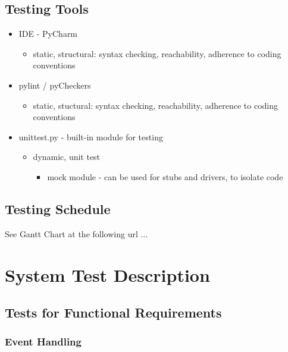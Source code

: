 \documentclass[12pt, titlepage]{article}
\begin{document}
	\subsection{Testing Tools}
	\begin{itemize}
		\itemsep0em
		\item IDE - PyCharm
		\vspace{-3mm}
		\begin{itemize}
			\item static, structural: syntax checking, reachability, adherence 
			to coding conventions
		\end{itemize}
		\item pylint / pyCheckers
		\vspace{-3mm}
		\begin{itemize}
			\item static, stuctural: syntax checking, reachability, adherence 
			to coding conventions
		\end{itemize}
		\item unittest.py - built-in module for testing
		\vspace{-3mm}
		\begin{itemize}
			\item dynamic, unit test
			\vspace{-2mm}
			\begin{itemize}
				\item mock module - can be used for stubs and drivers, to 
				isolate code
			\end{itemize}
		\end{itemize}
	\end{itemize}
		
	\subsection{Testing Schedule}
	
	See Gantt Chart at the following url ...
	\section{System Test Description}
	
	\subsection{Tests for Functional Requirements}
	\subsubsection{Event Handling}
	
\end{document}
